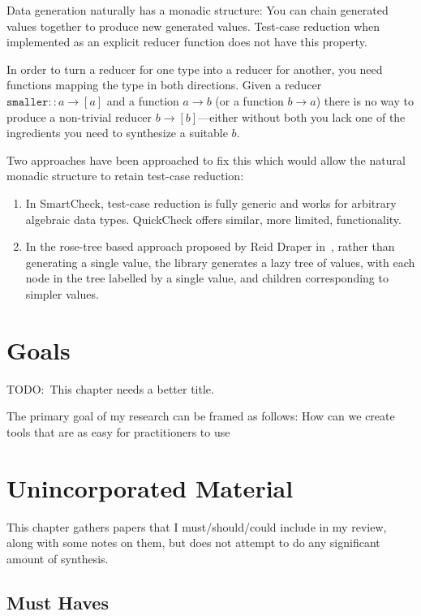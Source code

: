 Data generation naturally has a monadic structure:
You can chain generated values together to produce new generated values.
Test-case reduction when implemented as an explicit reducer function does not have this property.

In order to turn a reducer for one type into a reducer for another,
you need functions mapping the type in both directions.
Given a reducer \(\texttt{smaller} :: a \to [a]\) and a function \(a \to b\) (or a function \(b \to a\)) there is no way to produce a non-trivial reducer \(b \to [b]\)---either
without both you lack one of the ingredients you need to synthesize a suitable \(b\).

Two approaches have been approached to fix this which would allow the natural monadic structure to retain test-case reduction:

\begin{enumerate}
\item In SmartCheck\cite{DBLP:conf/haskell/Pike14},
test-case reduction is fully generic and works for arbitrary algebraic data types.
QuickCheck offers similar,
more limited,
functionality.
\item In the rose-tree based approach proposed by Reid Draper in~\cite{FreeShrinking},
rather than generating a single value,
the library generates a lazy tree of values,
with each node in the tree labelled by a single value,
and children corresponding to simpler values.
\end{enumerate}

\chapter{Goals}

TODO:\ This chapter needs a better title.

The primary goal of my research can be framed as follows:
How can we create tools that are as easy for practitioners to use 

\chapter{Unincorporated Material}

This chapter gathers papers that I must/should/could include in my review,
along with some notes on them,
but does not attempt to do any significant amount of synthesis.

\section{Must Haves}


